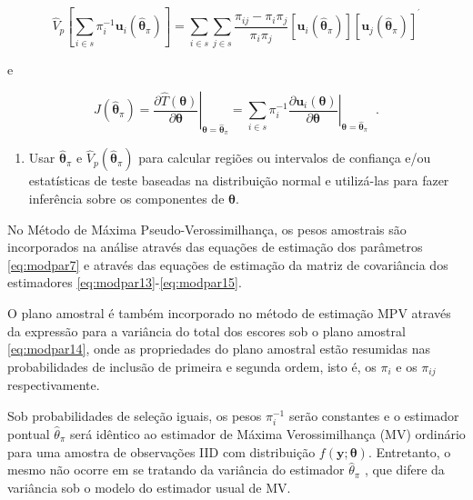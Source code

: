 \documentclass[]{book}
\providecommand{\tightlist}{%
  \setlength{\itemsep}{0pt}\setlength{\parskip}{0pt}}
\numberwithin{example}{chapter}
\numberwithin{remark}{chapter}
\numberwithin{definition}{chapter}
\let\BeginKnitrBlock\begin \let\EndKnitrBlock\end
\begin{document}
\begin{equation}
\hat{V}_{p}\left[ \sum\limits_{i\in s}\pi _{i}^{-1}\mathbf{u}_{i}\left( 
\mathbf{\hat{\theta}}_{\pi }\right) \right] =\sum\limits_{i\in
s}\sum\limits_{j\in s}\frac{\pi _{ij}-\pi _{i}\pi _{j}}{\pi _{i}\pi _{j}}
\left[ \mathbf{u}_{i}\left( \mathbf{\hat{\theta}}_{\pi }\right) \right]
\left[ \mathbf{u}_{j}\left( \mathbf{\hat{\theta}}_{\pi }\right) \right]
^{^{\prime }}  
\label{eq:modpar14}
\end{equation}

e

\begin{equation}
\hat{J}\left( \mathbf{\hat{\theta}}_{\pi }\right) =\left. \frac{\partial 
\widehat{T}\left( \mathbf{\theta }\right) }{\partial \mathbf{\theta }}
\right| _{\mathbf{\theta }=\mathbf{\hat{\theta}}_{\pi }}=\sum\limits_{i\in
s}\pi _{i}^{-1}\left. \frac{\partial \mathbf{u}_{i}\left( \mathbf{\theta }
\right) }{\partial \mathbf{\theta }}\right| _{\mathbf{\theta }=\mathbf{\hat{
\theta}}_{\pi }}\;\;.  
\label{eq:modpar15}
\end{equation}

\begin{enumerate}
\def\labelenumi{\arabic{enumi}.}
\setcounter{enumi}{2}
\tightlist
\item
  Usar \(\mathbf{\hat{\theta}}_{\pi }\) e
  \(\hat{V}_{p}\left( \mathbf{\hat{\theta}}_{\pi }\right)\) para
  calcular regiões ou intervalos de confiança e/ou estatísticas de teste
  baseadas na distribuição normal e utilizá-las para fazer inferência
  sobre os componentes de \(\mathbf{\theta}\).
\end{enumerate}

\BeginKnitrBlock{remark}
No Método de Máxima Pseudo-Verossimilhança,
os pesos amostrais são incorporados na análise através das equações de
estimação dos parâmetros \eqref{eq:modpar7} e através das equações de
estimação da matriz de covariância dos estimadores
\eqref{eq:modpar13}-\eqref{eq:modpar15}.
\EndKnitrBlock{remark}

\BeginKnitrBlock{remark}
O plano amostral é também incorporado no
método de estimação MPV através da expressão para a variância do total
dos escores sob o plano amostral \eqref{eq:modpar14}, onde as propriedades
do plano amostral estão resumidas nas probabilidades de inclusão de
primeira e segunda ordem, isto é, os \(\pi _{i}\) e os \(\pi _{ij}\)
respectivamente.
\EndKnitrBlock{remark}

\BeginKnitrBlock{remark}
Sob probabilidades de seleção iguais, os
pesos \(\pi _{i}^{-1}\) serão constantes e o estimador pontual
\(\hat{\theta}_{\pi }\) será idêntico ao estimador de Máxima
Verossimilhança (MV) ordinário para uma amostra de observações IID com
distribuição \(f\left(\mathbf{y;\theta }\right)\). Entretanto, o mesmo
não ocorre em se tratando da variância do estimador
\(\hat{\theta}_{\pi }\) , que difere da variância sob o modelo do
estimador usual de MV.\medskip
\EndKnitrBlock{remark}
\end{document}
